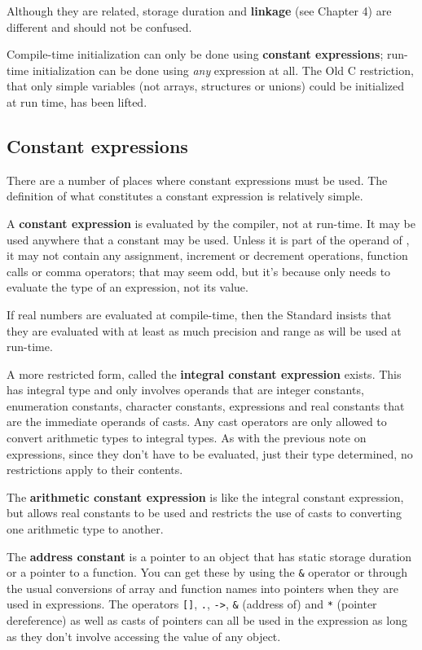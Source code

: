   Although they are related, storage duration and \textbf{linkage} (see
   Chapter 4) are different and should not be confused.


  Compile-time initialization can only be done using \textbf{constant
   expressions}; run-time initialization can be done using \textit{any}
   expression at all. The Old C restriction, that only simple variables (not
   arrays, structures or unions) could be initialized at run time, has been
   lifted.


  \subsection{Constant expressions}
   

   There are a number of places where constant expressions must be used. The
    definition of what constitutes a constant expression is relatively
    simple.


   A \textbf{constant expression} is evaluated by the compiler, not at
    run-time. It may be used anywhere that a constant may be used. Unless it is
    part of the operand of \sizeof, it may not contain any
    assignment, increment or decrement operations, function calls or comma
    operators; that may seem odd, but it's because \sizeof{} only
    needs to evaluate the type of an expression, not its value.


   If real numbers are evaluated at compile-time, then the Standard insists
    that they are evaluated with at least as much precision and range as will
    be used at run-time.


   A more restricted form, called the \textbf{integral constant
    expression} exists. This has integral type and only involves operands
    that are integer constants, enumeration constants, character constants,
    \sizeof{} expressions and real constants that are the immediate
    operands of casts. Any cast operators are only allowed to convert
    arithmetic types to integral types. As with the previous note on
    \sizeof{} expressions, since they don't have to be evaluated,
    just their type determined, no restrictions apply to their contents.


   The \textbf{arithmetic constant expression} is like the integral
    constant expression, but allows real constants to be used and restricts the
    use of casts to converting one arithmetic type to another.


   The \textbf{address constant} is a pointer to an object that has static
    storage duration or a pointer to a function. You can get these by using the
    \texttt{\&} operator or through the usual conversions of array and
    function names into pointers when they are used in expressions. The
    operators \texttt{[]}, \texttt{.}, \texttt{->},
    \texttt{\&} (address of) and \texttt{*} (pointer dereference) as
    well as casts of pointers can all be used in the expression as long as they
    don't involve accessing the value of any object.


